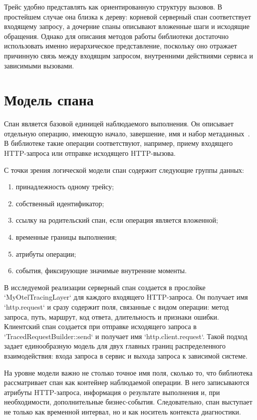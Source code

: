Трейс удобно представлять как ориентированную структуру вызовов. В простейшем
случае она близка к дереву: корневой серверный спан соответствует входящему
запросу, а дочерние спаны описывают вложенные шаги и исходящие обращения. Однако
для описания методов работы библиотеки достаточно использовать именно иерархическое
представление, поскольку оно отражает причинную связь между входящим запросом,
внутренними действиями сервиса и зависимыми вызовами.

\section{Модель спана}

Спан является базовой единицей наблюдаемого выполнения. Он описывает отдельную
операцию, имеющую начало, завершение, имя и набор метаданных~\cite{otelTraceApi,otelSdkSpan}.
В библиотеке такие операции соответствуют, например, приему входящего HTTP-запроса
или отправке исходящего HTTP-вызова.

С точки зрения логической модели спан содержит следующие группы данных:
\begin{enumerate}
    \item принадлежность одному трейсу;
    \item собственный идентификатор;
    \item ссылку на родительский спан, если операция является вложенной;
    \item временные границы выполнения;
    \item атрибуты операции;
    \item события, фиксирующие значимые внутренние моменты.
\end{enumerate}

В исследуемой реализации серверный спан создается в прослойке `MyOtelTracingLayer`
для каждого входящего HTTP-запроса. Он получает имя `http.request` и сразу
содержит поля, связанные с видом операции: метод запроса, путь, маршрут, код
ответа, длительность и признаки ошибки. Клиентский спан создается при отправке
исходящего запроса в `TracedRequestBuilder::send` и получает имя
`http.client.request`. Такой подход задает единообразную модель для двух главных
границ распределенного взаимодействия: входа запроса в сервис и выхода запроса к
зависимой системе.

На уровне модели важно не столько точное имя поля, сколько то, что библиотека
рассматривает спан как контейнер наблюдаемой операции. В него записываются
атрибуты HTTP-запроса, информация о результате выполнения и, при необходимости,
дополнительные бизнес-события. Следовательно, спан выступает не только как
временной интервал, но и как носитель контекста диагностики.

